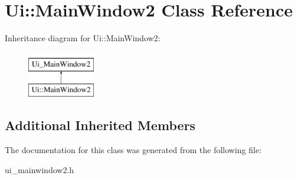 \hypertarget{classUi_1_1MainWindow2}{\section{Ui\-:\-:Main\-Window2 Class Reference}
\label{classUi_1_1MainWindow2}
}
Inheritance diagram for Ui\-:\-:Main\-Window2\-:\begin{figure}[H]
\begin{center}
\leavevmode
\includegraphics[height=2.000000cm]{classUi_1_1MainWindow2}
\end{center}
\end{figure}
\subsection*{Additional Inherited Members}


The documentation for this class was generated from the following file\-:\begin{DoxyCompactItemize}
\item 
ui\-\_\-mainwindow2.\-h\end{DoxyCompactItemize}
